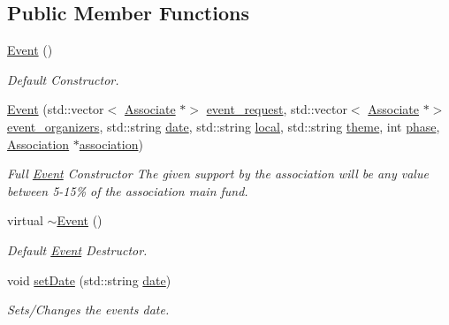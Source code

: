 \subsection*{Public Member Functions}
\begin{DoxyCompactItemize}
\item 
\mbox{\hyperlink{classEvent_a5a40dd4708297f7031e29b39e039ae10}{Event}} ()
\begin{DoxyCompactList}\small\item\em Default Constructor. \end{DoxyCompactList}\item 
\mbox{\hyperlink{classEvent_a2fb2bff37e364023fe54d0f86e49e696}{Event}} (std\+::vector$<$ \mbox{\hyperlink{classAssociate}{Associate}} $\ast$$>$ \mbox{\hyperlink{classEvent_a6cec387dca85f0a0e8419cfc94eb320e}{event\+\_\+request}}, std\+::vector$<$ \mbox{\hyperlink{classAssociate}{Associate}} $\ast$$>$ \mbox{\hyperlink{classEvent_ad35e04c759fdbfad75aed0b6e2eef63c}{event\+\_\+organizers}}, std\+::string \mbox{\hyperlink{classEvent_a9a93c9d38211f84cd6e347690e177f11}{date}}, std\+::string \mbox{\hyperlink{classEvent_a3d1f28a3bde9ab718d5b0003f8ab5129}{local}}, std\+::string \mbox{\hyperlink{classEvent_aa9cc4378d5cecaadc8e6de92b313e6f8}{theme}}, int \mbox{\hyperlink{classEvent_a4059db56458a92ddb5bd1d1443631b02}{phase}}, \mbox{\hyperlink{classAssociation}{Association}} $\ast$\mbox{\hyperlink{classEvent_a3c8694833e50dbd2e37943eff1f5c9b1}{association}})
\begin{DoxyCompactList}\small\item\em Full \mbox{\hyperlink{classEvent}{Event}} Constructor The given support by the association will be any value between 5-\/15\% of the association main fund. \end{DoxyCompactList}\item 
virtual \mbox{\hyperlink{classEvent_a7704ec01ce91e673885792054214b3d2}{$\sim$\+Event}} ()
\begin{DoxyCompactList}\small\item\em Default \mbox{\hyperlink{classEvent}{Event}} Destructor. \end{DoxyCompactList}\item 
void \mbox{\hyperlink{classEvent_a21f01e4574335753b415d3445f1ebdff}{set\+Date}} (std\+::string \mbox{\hyperlink{classEvent_a9a93c9d38211f84cd6e347690e177f11}{date}})
\begin{DoxyCompactList}\small\item\em Sets/\+Changes the event\textquotesingle{}s date. \end{DoxyCompactList}\item 

\end{DoxyCompactItemize}
